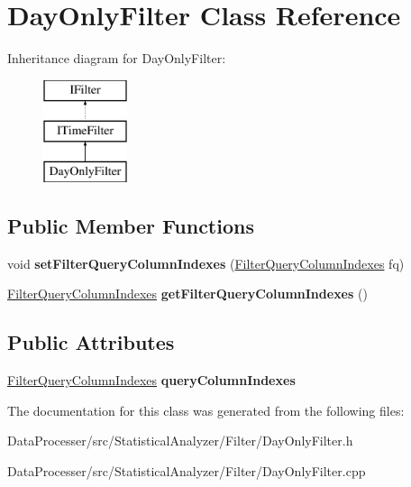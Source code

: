 \hypertarget{classDayOnlyFilter}{}\section{Day\+Only\+Filter Class Reference}
\label{classDayOnlyFilter}
Inheritance diagram for Day\+Only\+Filter\+:\begin{figure}[H]
\begin{center}
\leavevmode
\includegraphics[height=3.000000cm]{classDayOnlyFilter}
\end{center}
\end{figure}
\subsection*{Public Member Functions}
\begin{DoxyCompactItemize}
\item 
\mbox{\label{classDayOnlyFilter_a1f8472770c834980d9d6bf1e5095a7d4}} 
void {\bfseries set\+Filter\+Query\+Column\+Indexes} (\hyperlink{structFilterQueryColumnIndexes}{Filter\+Query\+Column\+Indexes} fq)
\item 
\mbox{\label{classDayOnlyFilter_ad0a9e2504b6bdcb383c625c7c277c279}} 
\hyperlink{structFilterQueryColumnIndexes}{Filter\+Query\+Column\+Indexes} {\bfseries get\+Filter\+Query\+Column\+Indexes} ()
\end{DoxyCompactItemize}
\subsection*{Public Attributes}
\begin{DoxyCompactItemize}
\item 
\mbox{\label{classDayOnlyFilter_aec030669d2438617efa3c7a68a199273}} 
\hyperlink{structFilterQueryColumnIndexes}{Filter\+Query\+Column\+Indexes} {\bfseries query\+Column\+Indexes}
\end{DoxyCompactItemize}


The documentation for this class was generated from the following files\+:\begin{DoxyCompactItemize}
\item 
Data\+Processer/src/\+Statistical\+Analyzer/\+Filter/Day\+Only\+Filter.\+h\item 
Data\+Processer/src/\+Statistical\+Analyzer/\+Filter/Day\+Only\+Filter.\+cpp\end{DoxyCompactItemize}
